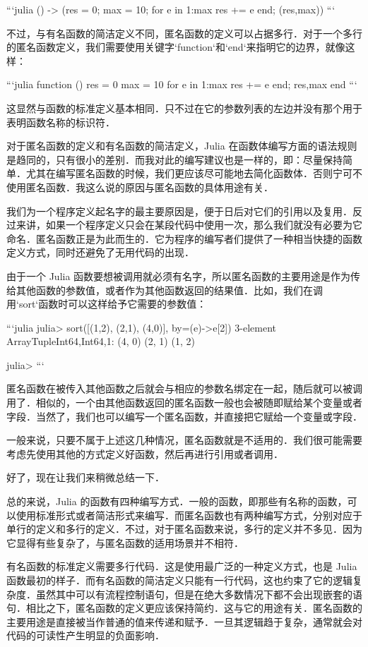```julia
() -> (res = 0; max = 10; for e in 1:max res += e end; (res,max))
```

不过，与有名函数的简洁定义不同，匿名函数的定义可以占据多行．对于一个多行的匿名函数定义，我们需要使用关键字`function`‌和`end`来指明它的边界，就像这样：

```julia
function ()
    res = 0
    max = 10
    for e in 1:max res += e end;
    res,max
end
```

这显然与函数的标准定义基本相同．只不过在它的参数列表的左边并没有那个用于表明函数名称的标识符．

对于匿名函数的定义和有名函数的简洁定义，Julia 在函数体编写方面的语法规则是趋同的，只有很小的差别．而我对此的编写建议也是一样的，即：尽量保持简单．尤其在编写匿名函数的时候，我们更应该尽可能地去简化函数体．否则宁可不使用匿名函数．我这么说的原因与匿名函数的具体用途有关．

我们为一个程序定义起名字的最主要原因是，便于日后对它们的引用以及复用．反过来讲，如果一个程序定义只会在某段代码中使用一次，那么我们就没有必要为它命名．匿名函数正是为此而生的．它为程序的编写者们提供了一种相当快捷的函数定义方式，同时还避免了无用代码的出现．

由于一个 Julia 函数要想被调用就必须有名字，所以匿名函数的主要用途是作为传给其他函数的参数值，或者作为其他函数返回的结果值．比如，我们在调用`sort`函数时可以这样给予它需要的参数值：

```julia
julia> sort([(1,2), (2,1), (4,0)], by=(e)->e[2])
3-element Array{Tuple{Int64,Int64},1}:
 (4, 0)
 (2, 1)
 (1, 2)

julia> 
```

匿名函数在被传入其他函数之后就会与相应的参数名绑定在一起，随后就可以被调用了．相似的，一个由其他函数返回的匿名函数一般也会被随即赋给某个变量或者字段．当然了，我们也可以编写一个匿名函数，并直接把它赋给一个变量或字段．

一般来说，只要不属于上述这几种情况，匿名函数就是不适用的．我们很可能需要考虑先使用其他的方式定义好函数，然后再进行引用或者调用．

好了，现在让我们来稍微总结一下．

总的来说，Julia 的函数有四种编写方式．一般的函数，即那些有名称的函数，可以使用标准形式或者简洁形式来编写．而匿名函数也有两种编写方式，分别对应于单行的定义和多行的定义．不过，对于匿名函数来说，多行的定义并不多见．因为它显得有些复杂了，与匿名函数的适用场景并不相符．

有名函数的标准定义需要多行代码．这是使用最广泛的一种定义方式，也是 Julia 函数最初的样子．而有名函数的简洁定义只能有一行代码，这也约束了它的逻辑复杂度．虽然其中可以有流程控制语句，但是在绝大多数情况下都不会出现嵌套的语句．相比之下，匿名函数的定义更应该保持简约．这与它的用途有关．匿名函数的主要用途是直接被当作普通的值来传递和赋予．一旦其逻辑趋于复杂，通常就会对代码的可读性产生明显的负面影响．